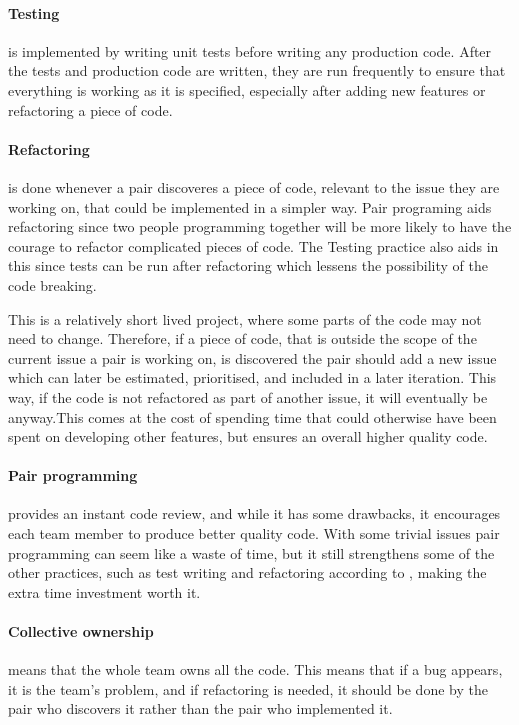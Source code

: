 \paragraph{Testing} is implemented by writing unit tests before writing any production code. After the tests and production code are written, they are run frequently to ensure that everything is working as it is specified, especially after adding new features or refactoring a piece of code.

\paragraph{Refactoring} is done whenever a pair discoveres a piece of code, relevant to the issue they are working on, that could be implemented in a simpler way. Pair programing aids refactoring since two people programming together will be more likely to have the courage to refactor complicated pieces of code. The Testing practice also aids in this since tests can be run after refactoring which lessens the possibility of the code breaking.

This is a relatively short lived project, where some parts of the code may not need to change. Therefore, if a piece of code, that is outside the scope of the current issue a pair is working on, is discovered the pair should add a new issue which can later be estimated, prioritised, and included in a later iteration. This way, if the code is not refactored as part of another issue, it will eventually be anyway.This comes at the cost of spending time that could otherwise have been spent on developing other features, but ensures an overall higher quality code. 

\paragraph{Pair programming} provides an instant code review, and while it has some drawbacks, it encourages each team member to produce better quality code. With some trivial issues pair programming can seem like a waste of time, but it still strengthens some of the other practices, such as test writing and refactoring according to \citet[p. 102]{xp:explained}, making the extra time investment worth it.
\paragraph{Collective ownership} means that the whole team owns all the code. This means that if a bug appears, it is the team's problem, and if refactoring is needed, it should be done by the pair who discovers it rather than the pair who implemented it.

